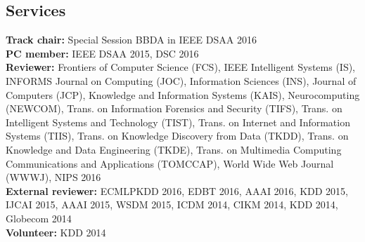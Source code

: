 \documentclass[margin, 10pt]{res} %
\begin{document}
\begin{resume}




\section{Services}

{\bf Track chair:} Special Session BBDA in IEEE DSAA 2016 \\
{\bf PC member:} IEEE DSAA 2015, DSC 2016 \\
{\bf Reviewer:}
Frontiers of Computer Science (FCS),
IEEE Intelligent Systems (IS),
INFORMS Journal on Computing (JOC),
Information Sciences (INS),
Journal of Computers (JCP),
Knowledge and Information Systems (KAIS),
Neurocomputing (NEWCOM),
Trans. on Information Forensics and Security (TIFS),
Trans. on Intelligent Systems and Technology (TIST),
Trans. on Internet and Information Systems (TIIS),
Trans. on Knowledge Discovery from Data (TKDD),
Trans. on Knowledge and Data Engineering (TKDE),
Trans. on Multimedia Computing Communications and Applications (TOMCCAP),
World Wide Web Journal (WWWJ), NIPS 2016 \\
{\bf External reviewer:} ECMLPKDD 2016, EDBT 2016, AAAI 2016, KDD 2015, IJCAI 2015, AAAI 2015,
WSDM 2015, ICDM 2014, CIKM 2014, KDD 2014, Globecom 2014 \\
{\bf Volunteer:} KDD 2014


\end{resume}
\end{document}
